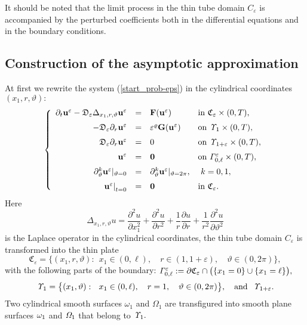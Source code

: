\documentclass[reqno]{amsart}            %
\numberwithin{equation}{section}
\begin{document}
It should be noted that the limit process in the thin tube domain $C_\varepsilon$ is accompanied by the perturbed coefficients both in the differential equations and in the boundary conditions.

\subsection{Construction of the asymptotic approximation}

At first we rewrite the system (\ref{start_prob-eps}) in the cylindrical coordinates $(x_1, r, \vartheta):$
\begin{equation}\label{start_prob-eps-c}
\left\{
    \begin{array}{rcll}
    \partial_t {\bf u}^\varepsilon - \mathfrak{D}_\varepsilon \Delta_{x_1,r,\vartheta}{\bf u}^\varepsilon  &=& {\bf F}({\bf u}^\varepsilon)
                    &\mbox{in} \ \mathfrak{C}_{\varepsilon}\times (0,T),
                    \\[2mm]
 - \mathfrak{D}_\varepsilon  \partial_{r} {\bf u}^\varepsilon &=&  \varepsilon^\varrho {\bf G}({\bf u}^\varepsilon)
                    &\mbox{on} \ {\it \Upsilon}_{1}\times (0,T),
                    \\[2mm]
  \mathfrak{D}_\varepsilon  \partial_{r} {\bf u}^\varepsilon &=&  0
                    &\mbox{on} \ {\it \Upsilon}_{1+\varepsilon}\times (0,T),
 \\[2mm]
  {\bf u}^\varepsilon &=& {\bf 0}& \text{on} \  {\it \Gamma}^\varepsilon_{0, \ell}\times (0,T),
 \\[2mm]
   \partial_{\vartheta}^k{\bf u}^\varepsilon|_{\vartheta=0} &=& \partial_{\vartheta}^k{\bf u}^\varepsilon|_{\vartheta=2\pi}, & \ k =0, 1,
 \\[2mm]
    \left. {\bf u}^\varepsilon\right|_{t=0} &=&{\bf 0} &\mbox{in} \   \mathfrak{C}_{\varepsilon}.
   \end{array}\right.
\end{equation}
Here
$$
\Delta_{x_1,r,\vartheta} u =
\frac{\partial^2 u}{\partial x_1^2} + \frac{\partial^2 u}{\partial r^2} +  \frac{1}{r}\frac{\partial u}{\partial r}
    + \frac{1}{r^2} \frac{\partial^2 u}{\partial \vartheta ^2}
$$
is the Laplace operator in the cylindrical coordinates, the thin tube domain $C_\varepsilon$ is transformed into the thin
plate
$$
\mathfrak{C}_{\varepsilon} = \Big\{(x_1, r, \vartheta): \ \ x_1 \in (0, \ell ) , \quad r \in (1, 1+\varepsilon), \quad \vartheta \in (0, 2 \pi) \Big\},
$$
with the following parts of the boundary: ${\it \Gamma}^\varepsilon_{0,\ell}:= \partial \mathfrak{C}_{\varepsilon} \cap \big(\{ x_1=0\}\cup \{ x_1=\ell\}\big),$
\begin{gather*}
    {\it \Upsilon}_1= \big\{(x_1, \vartheta): \ \ x_1 \in (0, \ell ) , \quad r =1,  \quad \vartheta \in (0, 2 \pi) \big\}, \quad \text{and} \ \
   {\it \Upsilon}_{1+\varepsilon}.
\end{gather*}
Two cylindrical smooth surfaces $\omega_1$ and $\Omega_1$ are transfigured into smooth plane surfaces ${\it \omega}_1$ and ${\it \Omega}_1$ that belong to ${\it \Upsilon}_1.$
\end{document}
